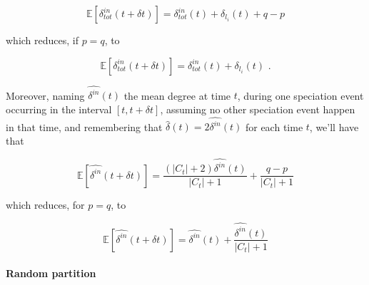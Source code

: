 \documentclass[12pt,a4paper]{report}
\begin{document}
\begin{equation}
\mathbb{E}\left[\delta^{in}_{tot}(t + \delta t)\right] = \delta^{in}_{tot}(t) + \delta_{l_i}(t) + q - p
\end{equation}

which reduces, if $p = q$, to

\begin{equation}
\mathbb{E}\left[\delta^{in}_{tot}(t + \delta t)\right] = \delta^{in}_{tot}(t) + \delta_{l_i}(t) \, \, .
\end{equation}

Moreover, naming $\widehat{\delta^{in}}(t)$ the mean degree at time $t$, during one speciation event occurring in the interval $\left[t,t + \delta t \right]$, assuming no other speciation event happen in that time, and remembering that $\hat{\delta}(t)=2\widehat{\delta^{in}}(t)$ for each time $t$, we'll have that

\begin{equation}
\mathbb{E}\left[\widehat{\delta^{in}}(t + \delta t)\right] = \frac{(|C_t|+2)\widehat{\delta^{in}}(t)}{|C_t|+1} + \frac{q - p}{|C_t|+1}
\end{equation}

which reduces, for $p = q$, to

\begin{equation}
\mathbb{E}\left[\widehat{\delta^{in}}(t + \delta t)\right] = \widehat{\delta^{in}}(t) +  \frac{\widehat{\delta^{in}}(t)}{|C_t|+1}
\end{equation}

\paragraph{Random partition}
\end{document}
